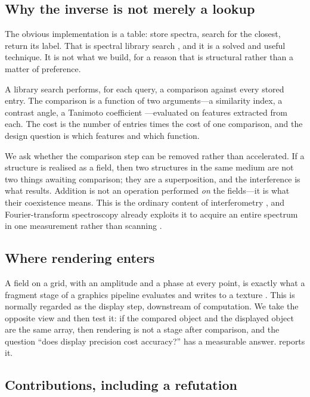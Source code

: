 \documentclass[11pt,twocolumn,a4paper]{article}
\theoremstyle{upthm}
\theoremstyle{definition}
\theoremstyle{remark}
\begin{document}
\subsection{Why the inverse is not merely a lookup}

The obvious implementation is a table: store spectra, search for the
closest, return its label. That is spectral library search
\citep{stein1994,wan2002}, and it is a solved and useful technique. It is
not what we build, for a reason that is structural rather than a matter
of preference.

A library search performs, for each query, a comparison against every
stored entry. The comparison is a function of two arguments---a
similarity index, a contrast angle, a Tanimoto coefficient
\citep{bajusz2015}---evaluated on features extracted from each. The cost
is the number of entries times the cost of one comparison, and the design
question is which features and which function.

We ask whether the comparison step can be removed rather than
accelerated. If a structure is realised as a field, then two structures
in the same medium are not two things awaiting comparison; they are a
superposition, and the interference is what results. Addition is not an
operation performed \emph{on} the fields---it is what their coexistence
means. This is the ordinary content of interferometry
\citep{bornwolf1999,mandelwolf1995}, and Fourier-transform spectroscopy
already exploits it to acquire an entire spectrum in one measurement
rather than scanning \citep{griffiths2007,fellgett1949,connes1966}.

\subsection{Where rendering enters}

A field on a grid, with an amplitude and a phase at every point, is
exactly what a fragment stage of a graphics pipeline evaluates and writes
to a texture \citep{akenine2018,owens2008}. This is normally regarded as
the display step, downstream of computation. We take the opposite view
and then test it: if the compared object and the displayed object are the
same array, then rendering is not a stage after comparison, and the
question ``does display precision cost accuracy?'' has a measurable
answer.  reports it.

\subsection{Contributions, including a refutation}
\end{document}
